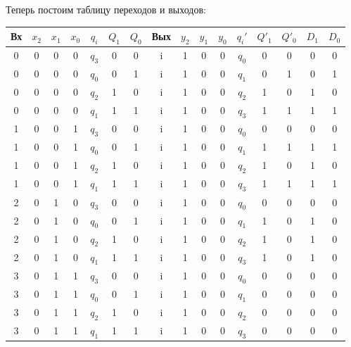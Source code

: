 Теперь постоим таблицу переходов и выходов:
\begin{table}[H]
\centering
\begin{tabularx}{\textwidth}{|C|CCC|C|CC|C|CC|C|CCC|CC|}
    \hline
    \small{Вх} & $x_2$ & $x_1$ & $x_0$ & $q_i$ & $Q_1$ & $Q_0$ & \small{Вых} & $y_2$ & $y_1$ & $y_0$ & $q_i'$ & $Q'_1$ & $Q'_0$
                    & $D_1$ & $D_0$ \\
      & 0 & 0 & 0   &   $q_3$ & 0 & 0   &   i & 1 & 0 & 0   &  $q_0$ & 0 & 0   &   0 & 0   \\
    0  & 0 & 0 & 0   &   $q_0$ & 0 & 1   &   i & 1 & 0 & 0   &  $q_1$ & 0 & 1   &   0 & 1   \\
    0  & 0 & 0 & 0   &   $q_2$ & 1 & 0   &   i & 1 & 0 & 0   &  $q_2$ & 1 & 0   &   1 & 0   \\
    0  & 0 & 0 & 0   &   $q_1$ & 1 & 1   &   i & 1 & 0 & 0   &  $q_3$ & 1 & 1   &   1 & 1   \\
      & 0 & 0 & 1   &   $q_3$ & 0 & 0   &   i & 1 & 0 & 0   &  $q_0$ & 0 & 0   &   0 & 0   \\
    1  & 0 & 0 & 1   &   $q_0$ & 0 & 1   &   i & 1 & 0 & 0   &  $q_1$ & 1 & 1   &   1 & 1   \\
    1  & 0 & 0 & 1   &   $q_2$ & 1 & 0   &   i & 1 & 0 & 0   &  $q_2$ & 1 & 0   &   1 & 0   \\
    1  & 0 & 0 & 1   &   $q_1$ & 1 & 1   &   i & 1 & 0 & 0   &  $q_3$ & 1 & 1   &   1 & 1   \\
      & 0 & 1 & 0   &   $q_3$ & 0 & 0   &   i & 1 & 0 & 0   &  $q_0$ & 0 & 0   &   0 & 0   \\
    2  & 0 & 1 & 0   &   $q_0$ & 0 & 1   &   i & 1 & 0 & 0   &  $q_1$ & 1 & 0   &   1 & 0   \\
    2  & 0 & 1 & 0   &   $q_2$ & 1 & 0   &   i & 1 & 0 & 0   &  $q_2$ & 1 & 0   &   1 & 0   \\
    2  & 0 & 1 & 0   &   $q_1$ & 1 & 1   &   i & 1 & 0 & 0   &  $q_3$ & 1 & 0   &   1 & 0   \\
      & 0 & 1 & 1   &   $q_3$ & 0 & 0   &   i & 1 & 0 & 0   &  $q_0$ & 0 & 0   &   0 & 0   \\
    3  & 0 & 1 & 1   &   $q_0$ & 0 & 1   &   i & 1 & 0 & 0   &  $q_1$ & 0 & 0   &   0 & 0   \\
    3  & 0 & 1 & 1   &   $q_2$ & 1 & 0   &   i & 1 & 0 & 0   &  $q_2$ & 0 & 0   &   0 & 0   \\
    3  & 0 & 1 & 1   &   $q_1$ & 1 & 1   &   i & 1 & 0 & 0   &  $q_3$ & 0 & 0   &   0 & 0   \\

\end{tabularx}
\end{table}
